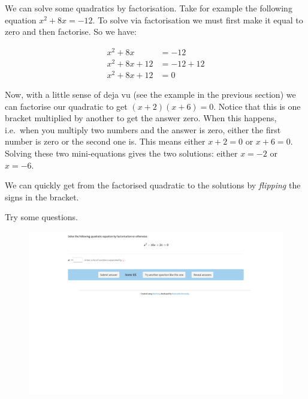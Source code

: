 \documentclass[
  a4paper,
]{scrbook}
\begin{document}
We can solve some quadratics by factorisation. Take for example the
following equation \(x^2 + 8x = -12\). To solve via factorisation we
must first make it equal to zero and then factorise. So we have:

\[
\begin{aligned} x^2 + 8x &= -12 \\
x^2 + 8x +12 &= -12 +12 \\
x^2 + 8x +12 &= 0
\end{aligned}
\]

Now, with a little sense of deja vu (see the example in the previous
section) we can factorise our quadratic to get \((x+2)(x+6)=0\). Notice
that this is one bracket multiplied by another to get the answer zero.
When this happens, i.e.~when you multiply two numbers and the answer is
zero, either the first number is zero or the second one is. This means
either \(x+2=0\) or \(x+6=0\). Solving these two mini-equations gives
the two solutions: either \(x=-2\) or \(x=-6\).

\begin{tcolorbox}[enhanced jigsaw, opacityback=0, left=2mm, toptitle=1mm, title=\textcolor{quarto-callout-tip-color}{\faLightbulb}\hspace{0.5em}{Pro tip}, breakable, colbacktitle=quarto-callout-tip-color!10!white, opacitybacktitle=0.6, bottomtitle=1mm, arc=.35mm, colback=white, leftrule=.75mm, bottomrule=.15mm, colframe=quarto-callout-tip-color-frame, rightrule=.15mm, titlerule=0mm, toprule=.15mm, coltitle=black]
We can quickly get from the factorised quadratic to the solutions by
\emph{flipping} the signs in the bracket.
\end{tcolorbox}

Try some questions.

\begin{figure}

{\centering 

\href{https://numbas.mathcentre.ac.uk/question/105345/quadratics-solving-by-factorisation/embed/?token=84458480-2b4c-4902-9920-c43792afedcd}{\includegraphics{./07-quadratics_files/figure-pdf/unnamed-chunk-3-1.png}}

}

\end{figure}
\end{document}
